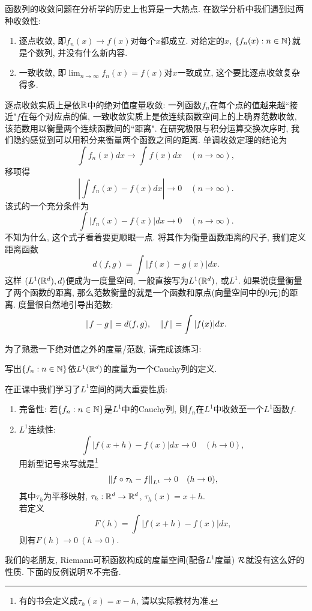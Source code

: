 函数列的收敛问题在分析学的历史上也算是一大热点. 
在数学分析中我们遇到过两种收敛性:
\begin{enumerate}
    \item 逐点收敛, 即$f_n(x) \to f(x)$对每个$x$都成立. 对给定的$x$, $\{f_n(x):n \in \mathbb{N}\}$就是个数列, 并没有什么新内容.
    \item 一致收敛, 即$\lim_{n \to \infty}f_n(x)=f(x)$对$x$一致成立, 这个要比逐点收敛复杂得多.
\end{enumerate}
逐点收敛实质上是依$\mathbb{R}$中的绝对值度量收敛: 一列函数$f_n$在每个点的值越来越``接近"$f$在每个对应点的值, 一致收敛实质上是依连续函数空间上的上确界范数收敛, 该范数用以衡量两个连续函数间的``距离".
在研究极限与积分运算交换次序时, 我们隐约感觉到可以用积分来衡量两个函数之间的距离. 单调收敛定理的结论为
$$\int f_n(x)dx \to \int f(x)dx \quad (n \to \infty),$$
移项得
$$\left|\int f_n(x)-f(x) dx \right| \to 0 \quad (n \to \infty).$$
该式的一个充分条件为
$$\int |f_n(x)-f(x)| dx \to 0 \quad (n \to \infty).$$
不知为什么, 这个式子看着要更顺眼一点. 将其作为衡量函数距离的尺子, 我们定义距离函数
$$d(f,g) = \int |f(x)-g(x)|dx. $$
这样
$(L^1(\mathbb{R}^d), d)$便成为一度量空间, 一般直接写为$L^1(\mathbb{R}^d)$, 或$L^1$. 
如果说度量衡量了两个函数的距离, 那么范数衡量的就是一个函数和原点(向量空间中的$0$元)的距离. 度量很自然地引导出范数:
$$\norm{f-g} = d(f, g), \quad \norm{f} = \int |f(x)|dx. $$

为了熟悉一下绝对值之外的度量/范数, 请完成该练习:
\begin{exercise}
    写出$\{f_n:n \in \mathbb{N}\}$依$L^1(\mathbb{R}^d)$的度量为一个Cauchy列的定义. 
\end{exercise}

在正课中我们学习了$L^1$空间的两大重要性质:
\begin{enumerate}
    \item 完备性: 若$\{f_n:n \in \mathbb{N}\}$是$L^1$中的Cauchy列, 则$f_n$在$L^1$中收敛至一个$L^1$函数$f$. 
    \item $L^1$连续性:
    $$\int |f(x+h)-f(x)|dx \to 0 \quad (h \to 0), $$
    用新型记号来写就是\footnote{有的书会定义成$\tau_h(x)=x-h$, 请以实际教材为准.}
    $$\norm{f \circ \tau_h - f}_{L^1} \to 0 \quad (h \to 0),$$
    其中$\tau_h$为平移映射, $\tau_h: \mathbb{R}^d \to \mathbb{R}^d$, $\tau_h(x) = x+h$. \\
    若定义$$F(h)=\int |f(x+h)-f(x)|dx,$$
    则有$F(h) \to 0~(h \to 0)$. 
\end{enumerate}


我们的老朋友, Riemann可积函数构成的度量空间(配备$L^1$度量)
$\mathcal{R}$就没有这么好的性质. 
下面的反例说明$\mathcal{R}$不完备.

